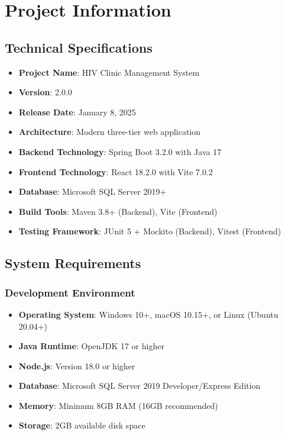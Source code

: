 \documentclass[12pt,a4paper]{article}
\begin{document}
\section{Project Information}

\subsection{Technical Specifications}

\begin{itemize}
    \item \textbf{Project Name}: HIV Clinic Management System
    \item \textbf{Version}: 2.0.0
    \item \textbf{Release Date}: January 8, 2025
    \item \textbf{Architecture}: Modern three-tier web application
    \item \textbf{Backend Technology}: Spring Boot 3.2.0 with Java 17
    \item \textbf{Frontend Technology}: React 18.2.0 with Vite 7.0.2
    \item \textbf{Database}: Microsoft SQL Server 2019+
    \item \textbf{Build Tools}: Maven 3.8+ (Backend), Vite (Frontend)
    \item \textbf{Testing Framework}: JUnit 5 + Mockito (Backend), Vitest (Frontend)
\end{itemize}

\subsection{System Requirements}

\subsubsection{Development Environment}
\begin{itemize}
    \item \textbf{Operating System}: Windows 10+, macOS 10.15+, or Linux (Ubuntu 20.04+)
    \item \textbf{Java Runtime}: OpenJDK 17 or higher
    \item \textbf{Node.js}: Version 18.0 or higher
    \item \textbf{Database}: Microsoft SQL Server 2019 Developer/Express Edition
    \item \textbf{Memory}: Minimum 8GB RAM (16GB recommended)
    \item \textbf{Storage}: 2GB available disk space
\end{itemize}
\end{document}
